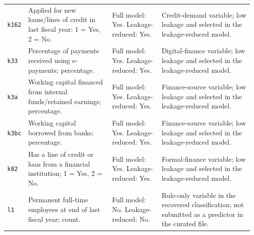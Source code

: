 \begin{longtable}{>{\RaggedRight\arraybackslash}p{1.3cm}>{\RaggedRight\arraybackslash}p{5.3cm}>{\RaggedRight\arraybackslash}p{3.0cm}>{\RaggedRight\arraybackslash}p{4.8cm}}
\texttt{k162} & Applied for new loans/lines of credit in last fiscal year; 1 = Yes, 2 = No. & Full model: Yes. Leakage-reduced: Yes. & Credit-demand variable; low leakage and selected in the leakage-reduced model. \\
\texttt{k33} & Percentage of payments received using e-payments; percentage. & Full model: Yes. Leakage-reduced: Yes. & Digital-finance variable; low leakage and selected in the leakage-reduced model. \\
\texttt{k3a} & Working capital financed from internal funds/retained earnings; percentage. & Full model: Yes. Leakage-reduced: Yes. & Finance-source variable; low leakage and selected in the leakage-reduced model. \\
\texttt{k3bc} & Working capital borrowed from banks; percentage. & Full model: Yes. Leakage-reduced: Yes. & Finance-source variable; low leakage and selected in the leakage-reduced model. \\
\texttt{k82} & Has a line of credit or loan from a financial institution; 1 = Yes, 2 = No. & Full model: Yes. Leakage-reduced: Yes. & Formal-finance variable; low leakage and selected in the leakage-reduced model. \\
\texttt{l1} & Permanent full-time employees at end of last fiscal year; count. & Full model: No. Leakage-reduced: No. & Rule-only variable in the recovered classification; not submitted as a predictor in the curated file. \\
\bottomrule
\end{longtable}
